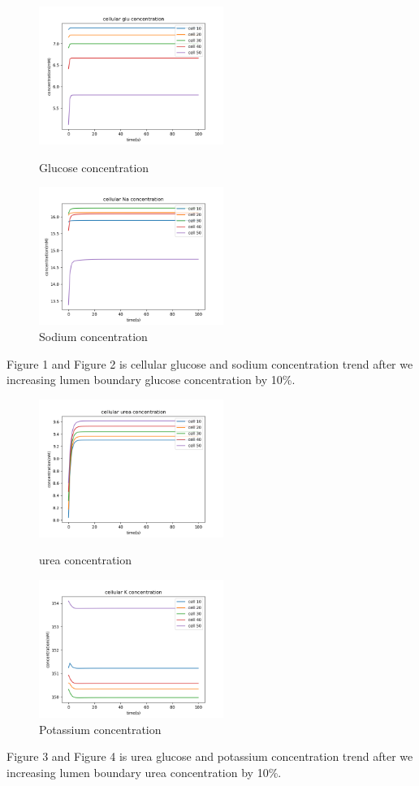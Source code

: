 \documentclass{article}
\begin{document}
\begin{figure}[H]
\centering
\begin{minipage}[t]{0.48\textwidth}
\centering
\includegraphics[width=6cm]{figure/figure1.png}
\caption{Glucose concentration}
\end{minipage}
\begin{minipage}[t]{0.48\textwidth}
\centering
\includegraphics[width=6cm]{figure/figure2.png}
\caption{Sodium concentration}
\end{minipage}
\end{figure}

Figure 1 and Figure 2 is cellular glucose and sodium concentration trend after we increasing lumen boundary glucose concentration by 10\%.

\begin{figure}[H]
\centering
\begin{minipage}[t]{0.48\textwidth}
\centering
\includegraphics[width=6cm]{figure/figure3.png}
\caption{urea concentration}
\end{minipage}
\begin{minipage}[t]{0.48\textwidth}
\centering
\includegraphics[width=6cm]{figure/figure4.png}
\caption{Potassium concentration}
\end{minipage}
\end{figure}
Figure 3 and Figure 4 is urea glucose and potassium concentration trend after we increasing lumen boundary urea concentration by 10\%.
\end{document}
